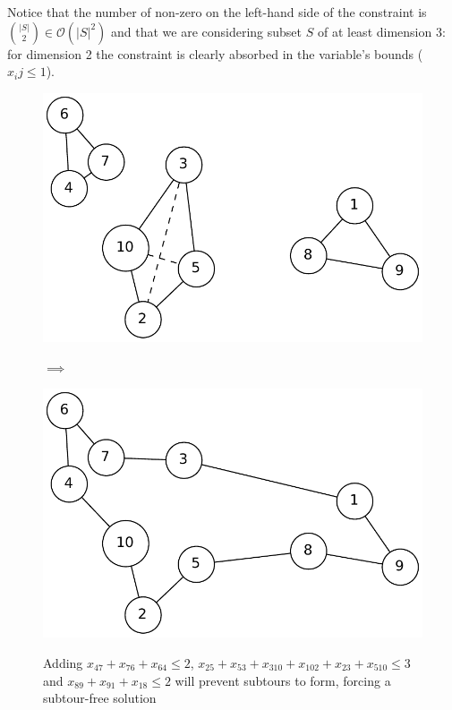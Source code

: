 Notice that the number of non-zero on the left-hand side of the constraint is
${|S|\choose 2} \in \mathcal{O}(|S|^2)$ and that we are considering subset $S$
of at least dimension 3: for dimension 2 the constraint is clearly absorbed in
the variable's bounds ($x_ij \le 1$).

\begin{figure}[h]
    \centering
    \begin{minipage}{.45\textwidth}
        \centering
        \includegraphics[width=0.8\linewidth]{figures/bendersa}
        \label{fig:sub1}
    \end{minipage}%
    \begin{minipage}{.1\textwidth}
        $\implies$
    \end{minipage}%
    \begin{minipage}{.45\textwidth}
        \centering
        \includegraphics[width=0.8\linewidth]{figures/bendersb}
        \label{fig:sub2}
    \end{minipage}
    \caption[Benders example]{\centering Adding $x_{47} + x_{76} + x_{64} \le 2$, $x_{25} + x_{53} +
    x_{310} + x_{102} + x_{23} + x_{510} \le 3$ and $x_{89} + x_{91} + x_{18} \le
    2$ will prevent subtours to form, forcing a subtour-free solution}
\end{figure}

